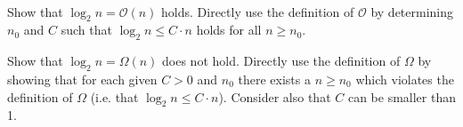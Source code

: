  \\
Show that $\log_2 n = \mathcal{O}(n)$ holds.
Directly use the definition of $\mathcal{O}$ by determining $n_0$ and $C$ such
that $\log_2 n \leq C \cdot n$ holds for all $n \geq n_0$.

Show that $\log_2 n = \Omega (n)$ does not hold.
Directly use the definition of $\Omega$ by showing that for each given $C > 0$
and $n_0$ there exists a $n \geq n_0$ which violates the definition of
$\Omega$ (i.e. that $\log_2 n \leq C \cdot n$).
Consider also that $C$ can be smaller than 1.
